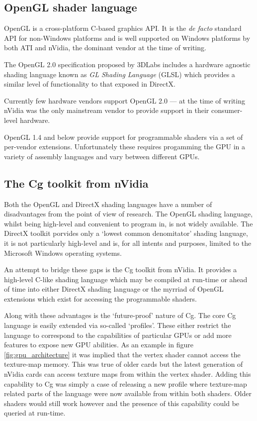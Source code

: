 \subsection{OpenGL shader language}

OpenGL\cite{GPU:OpenGLSpec} is a cross-platform C-based graphics API. 
It is the \emph{de facto} standard API for non-Windows platforms and
is well supported on Windows platforms by both ATI and nVidia, the dominant
vendor at the time of writing. 

The OpenGL 2.0 specification\cite{GPU:OpenGL2Overview} proposed by 3DLabs
includes a hardware agnostic shading language\cite{GPU:OpenGLShadingLanguage}
known as \emph{GL Shading Language} (GLSL) which provides a similar level
of functionality to that exposed in DirectX. 

Currently few hardware vendors support OpenGL 2.0 --- at the time of writing
nVidia was the only mainstream vendor to provide support in their
consumer-level hardware\cite{nvidia:7664relnotes}.

OpenGL 1.4 and below provide support for programmable shaders via a set of per-vendor
extensions. Unfortunately these requires progamming the GPU in a variety of
assembly languages and vary between different GPUs.

\subsection{The Cg toolkit from nVidia}

Both the OpenGL and DirectX shading languages have a number of disadvantages
from the point of view of research. The OpenGL shading language, whilst being
high-level and convenient to program in, is not widely available. The
DirectX toolkit porvides only a `lowest common denomitator' shading language,
it is not particularly high-level and is, for all intents and purposes, limited
to the Microsoft Windows operating systems. 

An attempt to bridge these gaps is the Cg toolkit\cite{nvidia:cgtoolkit} from nVidia.
It provides a high-level C-like shading language which may be compiled at run-time or
ahead of time into either DirectX shading language or the myrriad of OpenGL extensions
which exist for accessing the programmable shaders. 

Along with these advantages is the `future-proof' nature of Cg. The core Cg language
is easily extended via so-called `profiles'. These either restrict the language to
correspond to the capabilities of particular GPUs or add more features to expose
new GPU abilities. As an example in figure \ref{fig:gpu_architecture} it was implied
that the vertex shader cannot access the texture-map memory. This was true
of older cards but the latest generation of nVidia cards can
access texture maps from within the vertex shader\cite{nvidia:sm3unleashed}. Adding this
capability to Cg was simply a case of releasing a new profile where texture-map related
parts of the language were now available from within both shaders. Older shaders
would still work however and the presence of this capability could be queried
at run-time.


